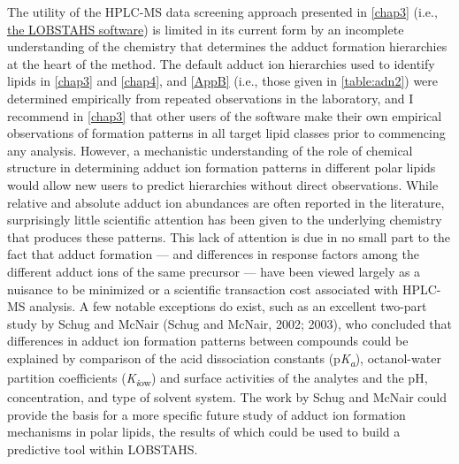 The utility of the HPLC-MS data screening approach presented in \autoref{chap3} (i.e., \href{https://github.com/vanmooylipidomics/LOBSTAHS}{the LOBSTAHS software}) is limited in its current form by an incomplete understanding of the chemistry that determines the adduct formation hierarchies at the heart of the method. The default adduct ion hierarchies used to identify lipids in \autoref{chap3} and \autoref{chap4}, and \autoref{AppB} (i.e., those given in \autoref{table:adn2}) were determined empirically from repeated observations in the laboratory, and I recommend in \autoref{chap3} that other users of the software make their own empirical observations of formation patterns in all target lipid classes prior to commencing any analysis. However, a mechanistic understanding of the role of chemical structure in determining adduct ion formation patterns in different polar lipids would allow new users to predict hierarchies without direct observations. While relative and absolute adduct ion abundances are often reported in the literature, surprisingly little scientific attention has been given to the underlying chemistry that produces these patterns. This lack of attention is due in no small part to the fact that adduct formation --- and differences in response factors among the different adduct ions of the same precursor --- have been viewed largely as a nuisance to be minimized or a scientific transaction cost associated with HPLC-MS analysis. A few notable exceptions do exist, such as an excellent two-part study by Schug and McNair (Schug and McNair, 2002; 2003), who concluded that differences in adduct ion formation patterns between compounds could be explained by comparison of the acid dissociation constants (p\emph{K\textsubscript{a}}), octanol-water partition coefficients (\emph{K}\textsubscript{\emph{i}ow}) and surface activities of the analytes and the pH, concentration, and type of solvent system. The work by Schug and McNair could provide the basis for a more specific future study of adduct ion formation mechanisms in polar lipids, the results of which could be used to build a predictive tool within LOBSTAHS.

